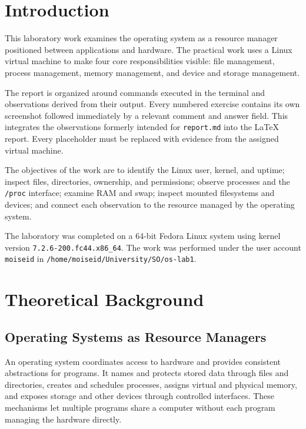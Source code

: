 \documentclass[12pt,a4paper]{article}
\begin{document}
\setcounter{page}{2}
\tableofcontents
\newpage

\section*{Introduction}

This laboratory work examines the operating system as a resource manager positioned between applications and hardware. The practical work uses a Linux virtual machine to make four core responsibilities visible: file management, process management, memory management, and device and storage management.

The report is organized around commands executed in the terminal and observations derived from their output. Every numbered exercise contains its own screenshot followed immediately by a relevant comment and answer field. This integrates the observations formerly intended for \texttt{report.md} into the LaTeX report. Every placeholder must be replaced with evidence from the assigned virtual machine.

The objectives of the work are to identify the Linux user, kernel, and uptime; inspect files, directories, ownership, and permissions; observe processes and the \texttt{/proc} interface; examine RAM and swap; inspect mounted filesystems and devices; and connect each observation to the resource managed by the operating system.

The laboratory was completed on a 64-bit Fedora Linux system using kernel version \texttt{7.2.6-200.fc44.x86\_64}. The work was performed under the user account \texttt{moiseid} in \texttt{/home/moiseid/University/SO/os-lab1}.

\newpage
\section{Theoretical Background}

\subsection{Operating Systems as Resource Managers}

An operating system coordinates access to hardware and provides consistent abstractions for programs. It names and protects stored data through files and directories, creates and schedules processes, assigns virtual and physical memory, and exposes storage and other devices through controlled interfaces. These mechanisms let multiple programs share a computer without each program managing the hardware directly.
\end{document}
